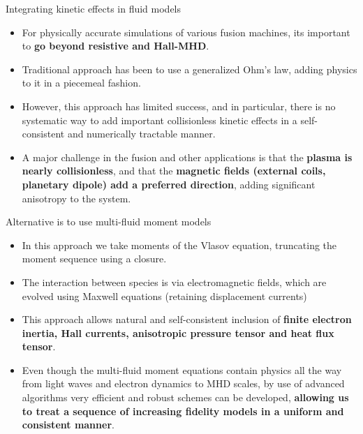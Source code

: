 \documentclass[aspectratio=43]{beamer}
\begin{document}
\begin{frame}{Integrating kinetic effects in fluid models}

  \begin{itemize}
  \item For physically accurate simulations of various fusion
    machines, its important to {\bf go beyond resistive and Hall-MHD}.
  \item Traditional approach has been to use a generalized Ohm's law,
    adding physics to it in a piecemeal fashion.
  \item However, this approach has limited success, and in particular,
    there is no systematic way to add important collisionless kinetic
    effects in a self-consistent and numerically tractable manner.
  \item A major challenge in the fusion and other applications is that
    the {\bf plasma is nearly collisionless}, and that the {\bf
      magnetic fields (external coils, planetary dipole) add a
      preferred direction}, adding significant anisotropy to the
    system.
  \end{itemize}

\end{frame}

\begin{frame}{Alternative is to use
    multi-fluid moment models}

  \begin{itemize}
  \item In this approach we take moments of the Vlasov equation,
    truncating the moment sequence using a closure.
  \item The interaction between species is via electromagnetic fields,
    which are evolved using Maxwell equations (retaining displacement
    currents)
  \item This approach allows natural and self-consistent inclusion of
    {\bf finite electron inertia, Hall currents, anisotropic pressure
      tensor and heat flux tensor}.
  \item Even though the multi-fluid moment equations contain physics
    all the way from light waves and electron dynamics to MHD scales,
    by use of advanced algorithms very efficient and robust schemes
    can be developed, {\bf allowing us to treat a sequence of
      increasing fidelity models in a uniform and consistent manner}.
  \end{itemize}

\end{frame}
\end{document}
